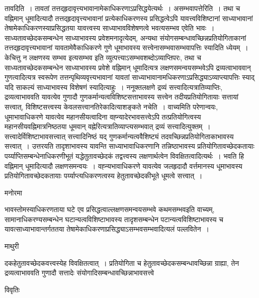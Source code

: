 \documentclass[10pt, openany]{book}
\begin{document}
{{\la तावदिति~।} तावतां तत्तद्हृदावृत्त्यभावानामेकाधिकरणाऽप्रसिद्धयेत्यर्थः~। {\qt असम्भवापत्तेरिति~।} तथा च वह्निमान् धूमादित्यादौ तत्तद्हृदावृत्त्यभावानां प्रत्येकाधिकरणस्य प्रसिद्धत्वेऽपि यावत्त्वविशिष्टानां साध्याभावानां तेषामेकाधिकरणस्याप्रसिद्धतया यावत्त्वस्य साध्याभावविशेषणत्वे भवत्यसम्भव एवेति भावः~। साध्यतावच्छेदकसम्बन्धेन साध्याभावस्य प्रवेशमनादृत्येदम्, अन्यथा संयोगसम्बन्धावच्छिन्नप्रतियोगिताकानां तत्तद्हृदावृत्त्यभावानां यावतामेवैकाधिकरणे गुणे धूमाभावस्य सत्त्वेनासम्भवासम्भवापत्तिः स्यादिति ध्येयम्~। {\qt केचित्तु} न लक्षणस्य सम्भव इत्यसम्भव इति व्युत्पत्त्याऽसम्भवशब्दोऽव्याप्तिपरः, तथा च साध्यतावच्छेदकसम्बन्धेन साध्याभावस्य प्रवेशे वह्निमान् धूमादित्यत्र लक्षणसमन्वयसम्भवेऽपि द्रव्यत्वाभाववान् गुणत्वादित्यत्र स्वरूपेण तत्तन्पृथिव्यवृत्त्यभावानां यावतां साध्याभावानामधिकरणाऽप्रसिद्ध्याऽव्याप्त्यापत्तिः स्याद् यदि साकल्यं साध्याभावस्य विशेषणं स्यादित्याहुः~। ननूक्तलक्षणे द्रव्यं सत्त्वादित्यत्रातिव्याप्तिः, द्रव्यत्वाभाववति यावत्येव गुणादौ गुणकर्मान्यत्वविशिष्टसत्ताभावस्य सत्त्वेन तदीयप्रतियोगितायाः सत्तायां सत्त्वात्, विशिष्टसत्त्वस्य केवलसत्त्वानतिरेकादित्याशङ्कते नचेति~। वाच्यमिति
परेणान्वयः, धूमाभावाधिकरणे यावत्येव महानसीयत्वादिना वह्न्यादेरभावसत्त्वेऽपि तत्प्रतियोगित्वस्य महानसीयवह्निमात्रनिष्ठतया धूमवान् वह्नेरित्यत्रातिव्याप्त्यसम्भवात् द्रव्यं सत्त्वादित्युक्तम्~। सत्त्वादेर्विशिष्टाभावसत्त्वात् सत्त्वादिनिष्ठं यद् गुणकर्मान्यत्ववैशिष्ट्यं तदवच्छिन्नप्रतियोगिताकाभावस्य सत्त्वात्~। उत्तरयति
तादृशाभावस्य यावन्ति साध्याभावाधिकरणानि तन्निष्ठाभावस्य प्रतियोगितावच्छेदकतायाः पर्य्याप्तिसम्बन्धेनाधिकरणीभूतं यद्धेतुतावच्छेदकं तद्वत्त्वस्य लक्षणार्थत्वेन विवक्षितत्वादित्यर्थः~। भवति हि वह्निमान् धूमादित्यादौ लक्षणसमन्वयः~। वह्न्यभावाधिकरणे यावत्येव जलहृदादौ वर्त्तमानस्य धूमाभावस्य प्रतियोगितावच्छेदकतायाः पर्य्याप्त्यधिकरणत्वस्य हेतुतावच्छेदकीभूते धूमत्वे सत्त्वात्~।
\begin{center}   मनोरमा  \end{center}
भावस्तोमस्याधिकरणताया घटे एव प्रसिद्धत्वाल्लक्षणसमन्वयसम्भवे कथमसम्भवइति वाच्यम्, सामानाधिकरण्यसम्बन्धेन घटान्यत्वविशिष्टाभावस्य तादृशसम्बन्धेन
पटान्यत्वविशिष्टाभावस्य च यावत्साध्याभावान्तर्गततया तेषामेकाधिकरणाप्रसिद्ध्याऽसम्भवसम्भवादित्यलं पल्लवितेन~।
\newpage
 \begin{center}  माथुरी  \end{center} 
{\la दकहेतुतावच्छेदकवत्त्वस्येह विवक्षितत्वात्~। प्रतियोगिता च हेतुतावच्छेदकसम्बन्धावच्छिन्ना ग्राह्या, तेन द्रव्यत्वाभाववति गुणादौ सत्तादेः संयोगादिसम्बन्धावच्छिन्नाभावसत्त्वे}
\begin{center}     विवृतिः \end{center}
}
\end{document}
